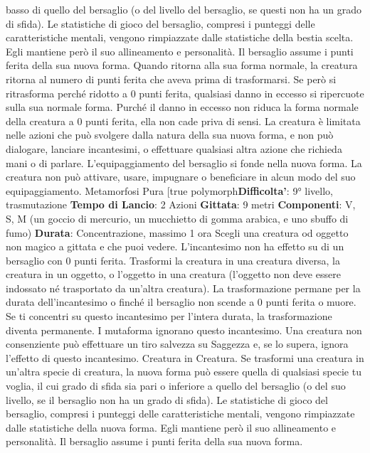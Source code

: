 \begin{multicols}{2}
basso di quello del bersaglio (o del livello del bersaglio,
se questi non ha un grado di sfida). Le statistiche di
gioco del bersaglio, compresi i punteggi delle
caratteristiche mentali, vengono rimpiazzate dalle 
statistiche della bestia scelta. Egli mantiene però il suo
allineamento e personalità.
Il bersaglio assume i punti ferita della sua nuova forma.
Quando ritorna alla sua forma normale, la creatura
ritorna al numero di punti ferita che aveva prima di
trasformarsi. Se però si ritrasforma perché ridotto a 0
punti ferita, qualsiasi danno in eccesso si ripercuote
sulla sua normale forma. Purché il danno in eccesso
non riduca la forma normale della creatura a 0 punti
ferita, ella non cade priva di sensi.
La creatura è limitata nelle azioni che può svolgere
dalla natura della sua nuova forma, e non può
dialogare, lanciare incantesimi, o effettuare qualsiasi
altra azione che richieda mani o di parlare.
L’equipaggiamento del bersaglio si fonde nella nuova
forma. La creatura non può attivare, usare, impugnare o
beneficiare in alcun modo del suo equipaggiamento.
Metamorfosi Pura
[true polymorph\textbf{Difficolta'}:
9° livello, trasmutazione
\textbf{Tempo di Lancio}: 2 Azioni
\textbf{Gittata}: 9 metri
\textbf{Componenti}: V, S, M (un goccio di mercurio, un
mucchietto di gomma arabica, e uno sbuffo di fumo)
\textbf{Durata}: Concentrazione, massimo 1 ora
Scegli una creatura od oggetto non magico a gittata e
che puoi vedere. L’incantesimo non ha effetto su di un
bersaglio con 0 punti ferita. Trasformi la creatura in una
creatura diversa, la creatura in un oggetto, o l’oggetto in
una creatura (l’oggetto non deve essere indossato né
trasportato da un’altra creatura). La trasformazione
permane per la durata dell’incantesimo o finché il
bersaglio non scende a 0 punti ferita o muore. Se ti
concentri su questo incantesimo per l’intera durata, la
trasformazione diventa permanente.
I mutaforma ignorano questo incantesimo. Una creatura
non consenziente può effettuare un tiro salvezza su
Saggezza e, se lo supera, ignora l’effetto di questo
incantesimo.
Creatura in Creatura. Se trasformi una creatura in
un’altra specie di creatura, la nuova forma può essere
quella di qualsiasi specie tu voglia, il cui grado di sfida
sia pari o inferiore a quello del bersaglio (o del suo
livello, se il bersaglio non ha un grado di sfida). Le
statistiche di gioco del bersaglio, compresi i punteggi
delle caratteristiche mentali, vengono rimpiazzate dalle
statistiche della nuova forma. Egli mantiene però il suo
allineamento e personalità.
Il bersaglio assume i punti ferita della sua nuova forma.

\end{multicols}
